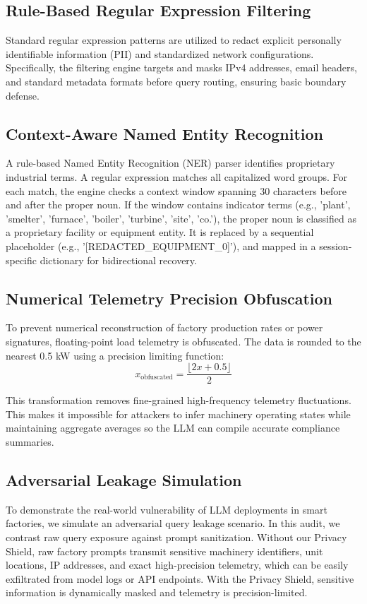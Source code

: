 \documentclass[journal]{IEEEtran}
\begin{document}
\subsection{Rule-Based Regular Expression Filtering}
Standard regular expression patterns are utilized to redact explicit personally identifiable information (PII) and standardized network configurations. Specifically, the filtering engine targets and masks IPv4 addresses, email headers, and standard metadata formats before query routing, ensuring basic boundary defense.

\subsection{Context-Aware Named Entity Recognition}
A rule-based Named Entity Recognition (NER) parser identifies proprietary industrial terms. A regular expression matches all capitalized word groups. For each match, the engine checks a context window spanning 30 characters before and after the proper noun. If the window contains indicator terms (e.g., 'plant', 'smelter', 'furnace', 'boiler', 'turbine', 'site', 'co.'), the proper noun is classified as a proprietary facility or equipment entity. It is replaced by a sequential placeholder (e.g., '[REDACTED\_EQUIPMENT\_0]'), and mapped in a session-specific dictionary for bidirectional recovery.

\subsection{Numerical Telemetry Precision Obfuscation}
To prevent numerical reconstruction of factory production rates or power signatures, floating-point load telemetry is obfuscated. The data is rounded to the nearest 0.5 kW using a precision limiting function:
\begin{equation}
x_{\text{obfuscated}} = \frac{\lfloor 2x + 0.5 \rfloor}{2}
\label{eq:rounding}
\end{equation}

This transformation removes fine-grained high-frequency telemetry fluctuations. This makes it impossible for attackers to infer machinery operating states while maintaining aggregate averages so the LLM can compile accurate compliance summaries.

\subsection{Adversarial Leakage Simulation}
To demonstrate the real-world vulnerability of LLM deployments in smart factories, we simulate an adversarial query leakage scenario. In this audit, we contrast raw query exposure against prompt sanitization. Without our Privacy Shield, raw factory prompts transmit sensitive machinery identifiers, unit locations, IP addresses, and exact high-precision telemetry, which can be easily exfiltrated from model logs or API endpoints. With the Privacy Shield, sensitive information is dynamically masked and telemetry is precision-limited.
\end{document}
